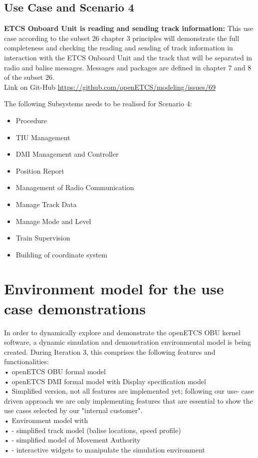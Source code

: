 \subsection{Use Case and Scenario 4}
\textbf{ETCS Onboard Unit is reading and sending track information:}
This use case according to the subset 26 chapter 3 principles will demonstrate the full completeness and checking the reading and sending of track information in interaction with the ETCS Onboard Unit and the track that will be separated in radio and balise messages. Messages and packages are defined in chapter 7 and 8 of the subset 26.\\ 
Link on Git-Hub \url{https://github.com/openETCS/modeling/issues/69}

The following Subsystems needs to be realised for Scenario 4:\\
\begin{itemize}
\item Procedure
\item TIU Management
\item DMI Management and Controller
\item Position Report
\item Management of Radio Communication
\item Manage Track Data
\item Manage Mode and Level
\item Train Supervision
\item Building of coordinate system
\end{itemize}

\section{Environment model for the use case demonstrations}

%
% 
%
%


In order to dynamically explore and demonstrate the openETCS OBU kernel software, a dynamic simulation and demonstration environmental model is being created.
During Iteration 3, this comprises the following features and functionalities:\\
•   openETCS OBU formal model \\
•   openETCS DMI formal model with Display specification model\\
•      Simplified version, not all features are implemented yet; following our use- case driven approach we are only implementing features that are essential to show the use cases selected by our "internal customer".\\
•    Environment model with \\
•  	- simplified track model (balise locations, speed profile)\\
•  	- simplified model of Movement Authority\\
•  	- interactive widgets to manipulate the simulation environment\\
\\
\\
\\

